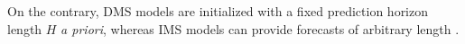 \documentclass[a4paper,oneside,bibliography=totoc]{scrbook}
\begin{document}
On the contrary, DMS models are initialized with a fixed prediction horizon length $H$ \textit{a priori}, whereas IMS models can provide forecasts of arbitrary length \cite{bergsma_sutranets_2023}.
\newline
\end{document}
